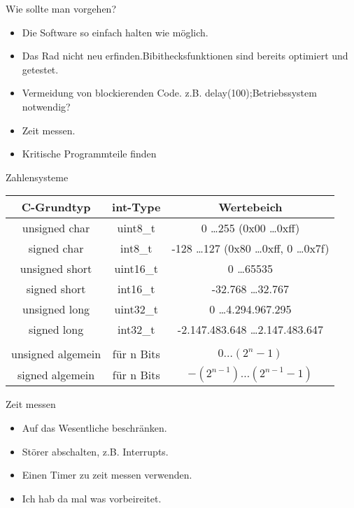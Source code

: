 \documentclass{beamer}
\begin{document}
\begin{frame}{Wie sollte man vorgehen?}

  \begin{itemize}
 \item Die Software so einfach halten wie möglich.\pause 
 \item Das Rad nicht neu erfinden.\newline Bibithecksfunktionen sind bereits optimiert und getestet.\pause
 \item Vermeidung von blockierenden Code. z.B. delay(100);\newline Betriebssystem notwendig? \pause
 \item Zeit messen.\pause
 \item Kritische Programmteile finden 
  \end{itemize}
\end{frame}

\begin{frame}{Zahlensysteme}

\begin{tabular}[c] {ccc}
C-Grundtyp 		& int-Type 	& Wertebeich \\
\hline
unsigned char 	& uint8\_t 	& 0 \ldots 255 (0x00 \ldots 0xff) \\
signed char 		& int8\_t 	& -128 \ldots 127 (0x80 \ldots 0xff, 0 \ldots 0x7f)\\
unsigned short 	& uint16\_t 	& 0 \ldots 65535 \\
signed short 		& int16\_t 	& -32.768 \ldots 32.767\\
unsigned long 	& uint32\_t 	& 0 \ldots 4.294.967.295\\
signed long 		& int32\_t 	& -2.147.483.648 \ldots 2.147.483.647\\
\hline
\\
unsigned algemein& f\"ur n Bits & $0 \ldots (2^n-1)$ \\
signed algemein& f\"ur n Bits& $-(2^{n-1}) \ldots (2^{n-1}-1)$ \\
\end{tabular}
\end{frame}

\begin{frame}{Zeit messen}

\begin{itemize}
 \item Auf das Wesentliche beschränken.\pause 
 \item Störer abschalten, z.B. Interrupts.\pause
 \item Einen Timer zu zeit messen verwenden.\pause
 \item Ich hab da mal was vorbeireitet.
\end{itemize}
\end{frame}
\end{document}
